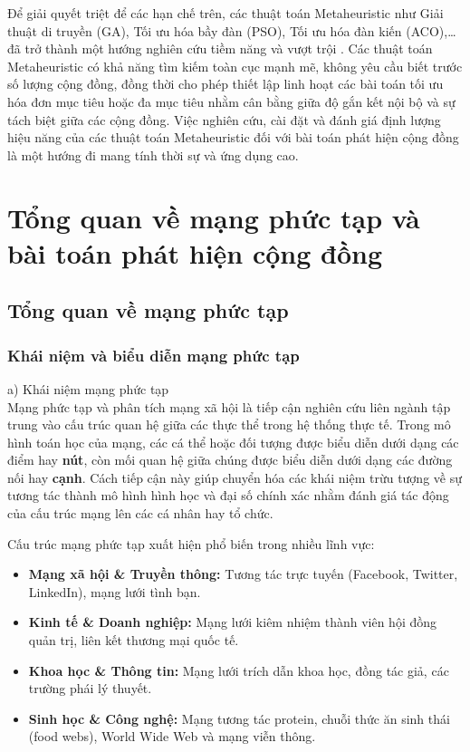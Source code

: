 \documentclass[14pt,a4paper]{extarticle}
\begin{document}
Để giải quyết triệt để các hạn chế trên, các thuật toán Metaheuristic như Giải thuật di truyền (GA), Tối ưu hóa bầy đàn (PSO), Tối ưu hóa đàn kiến (ACO),\ldots đã trở thành một hướng nghiên cứu tiềm năng và vượt trội \cite{Baraa2021}. Các thuật toán Metaheuristic có khả năng tìm kiếm toàn cục mạnh mẽ, không yêu cầu biết trước số lượng cộng đồng, đồng thời cho phép thiết lập linh hoạt các bài toán tối ưu hóa đơn mục tiêu hoặc đa mục tiêu nhằm cân bằng giữa độ gắn kết nội bộ và sự tách biệt giữa các cộng đồng. Việc nghiên cứu, cài đặt và đánh giá định lượng hiệu năng của các thuật toán Metaheuristic đối với bài toán phát hiện cộng đồng là một hướng đi mang tính thời sự và ứng dụng cao.

\newpage
\section{Tổng quan về mạng phức tạp và bài toán phát hiện cộng đồng}

\subsection{Tổng quan về mạng phức tạp}
\subsubsection{Khái niệm và biểu diễn mạng phức tạp}

\noindent a) Khái niệm mạng phức tạp
\\ \indent Mạng phức tạp và phân tích mạng xã hội là tiếp cận nghiên cứu liên ngành tập trung vào cấu trúc quan hệ giữa các thực thể trong hệ thống thực tế. Trong mô hình toán học của mạng, các cá thể hoặc đối tượng được biểu diễn dưới dạng các điểm hay \textbf{nút}, còn mối quan hệ giữa chúng được biểu diễn dưới dạng các đường nối hay \textbf{cạnh}. Cách tiếp cận này giúp chuyển hóa các khái niệm trừu tượng về sự tương tác thành mô hình hình học và đại số chính xác nhằm đánh giá tác động của cấu trúc mạng lên các cá nhân hay tổ chức.

Cấu trúc mạng phức tạp xuất hiện phổ biến trong nhiều lĩnh vực:
\begin{itemize}
    \item \textbf{Mạng xã hội \& Truyền thông:} Tương tác trực tuyến (Facebook, Twitter, LinkedIn), mạng lưới tình bạn.
    \item \textbf{Kinh tế \& Doanh nghiệp:} Mạng lưới kiêm nhiệm thành viên hội đồng quản trị, liên kết thương mại quốc tế.
    \item \textbf{Khoa học \& Thông tin:} Mạng lưới trích dẫn khoa học, đồng tác giả, các trường phái lý thuyết.
    \item \textbf{Sinh học \& Công nghệ:} Mạng tương tác protein, chuỗi thức ăn sinh thái (food webs), World Wide Web và mạng viễn thông.
\end{itemize}
\end{document}

